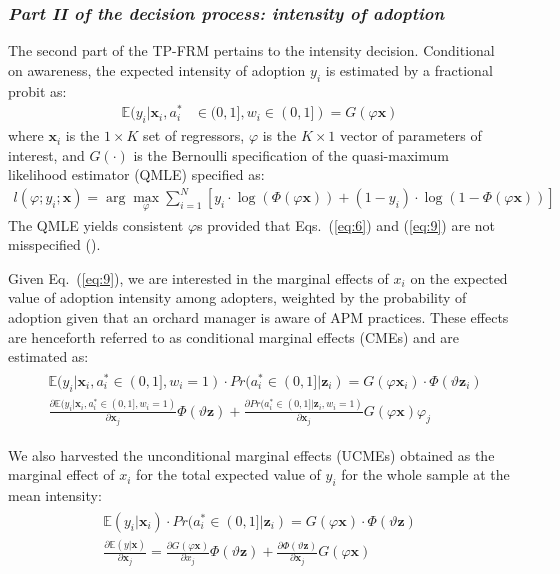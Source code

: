 \documentclass[fleqn,twoside,reqno]{article}
\begin{document}
\subsubsection*{\textit{Part II of the decision process: intensity of adoption}}
The second part of the TP-FRM pertains to the intensity decision. Conditional on awareness, the expected intensity of adoption $y_i$ is estimated by a fractional probit as:
\begin{align}
\mathbb{E}(y_i | \mathbf{x}_i, a_i^* &\in (0,1], w_i \in (0,1]) = G(\varphi \mathbf{x})
\label{eq:9}
\end{align}
where $\mathbf{x}_i$ is the $1 \times K$ set of regressors, $\varphi$ is the $K \times 1$ vector of parameters of interest, and $G(\cdot)$ is the Bernoulli specification of the quasi-maximum likelihood estimator (QMLE) specified as:
\begin{align}
l(\varphi;y_i;\mathbf{x}) = \arg \max_{\varphi} \sum_{i=1}^{N} [y_i \cdot \log(\Phi(\varphi \mathbf{x})) + (1 - y_i) \cdot \log(1 - \Phi(\varphi \mathbf{x}))]
\end{align}
The QMLE yields consistent $\varphi$s provided that Eqs.~(\ref{eq:6}) and (\ref{eq:9}) are not misspecified (\cite{Papke1996}). 

Given Eq.~(\ref{eq:9}), we are interested in the marginal effects of $x_i$ on the expected value of adoption intensity among adopters, weighted by the probability of adoption given that an orchard manager is aware of APM practices. These effects are henceforth referred to as conditional marginal effects (CMEs) and are estimated as:
\begin{align}
\begin{split}
& \mathbb{E}(y_i | \mathbf{x}_i, a_i^* \in (0,1], w_i = 1) \cdot Pr(a_i^* \in (0,1]|\mathbf{z}_i) = G(\varphi \mathbf{x}_i) \cdot \Phi(\vartheta \mathbf{z}_i) \\
& \frac{\partial \mathbb{E}(y_i|\mathbf{x}_i,a^*_i\in(0,1],w_i=1)}{\partial \mathbf{x}_j}{\Phi(\vartheta \mathbf{z})} + \frac{\partial Pr(a^*_i\in(0,1]|\mathbf{z}_i,w_i=1)}{\partial \mathbf{x}_j}{G(\varphi \mathbf{x})\varphi_j}
\end{split}
\end{align}

We also harvested the unconditional marginal effects (UCMEs) obtained as the marginal effect of $x_i$ for the total expected value of $y_i$ for the whole sample at the mean intensity: 
\begin{align}
\begin{split}
  \mathbb{E}(y_i | \mathbf{x}_i )\cdot Pr(a_i^* \in (0,1]|\mathbf{z}_i) = G(\varphi \mathbf{x}) \cdot \Phi(\vartheta \mathbf{z})\\
\frac{\partial \mathbb{E}(y|\mathbf{x})}{\partial \mathbf{x}_j}
= \frac{\partial G(\varphi \mathbf{x})}{\partial x_j} \Phi(\vartheta \mathbf{z}) + \frac{\partial \Phi(\vartheta \mathbf{z})}{\partial \mathbf{x}_j} G(\varphi \mathbf{x})
\end{split}
\end{align}
\end{document}
